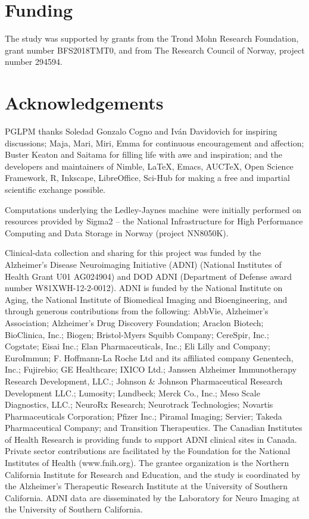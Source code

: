 \documentclass[utf8]{FrontiersinHarvard_mod} %
\renewcommand*{\|}[1][]{\nonscript\:#1\vert\nonscript\:\mathopen{}}
\newcommand*{\ljm}{Ledley-Jaynes machine}
\begin{document}
\section*{Funding}
The study was supported by grants from the Trond Mohn Research Foundation, grant number BFS2018TMT0, and from The Research Council of Norway, project number 294594.

\section*{Acknowledgements}
PGLPM thanks Soledad Gonzalo Cogno and Iv\'an Davidovich for inspiring discussions;
Maja, Mari, Miri, Emma for continuous encouragement and affection; Buster Keaton and Saitama for filling life with awe and inspiration; and the developers and maintainers of Nimble, \LaTeX, Emacs, AUC\TeX, Open Science Framework, R, Inkscape, LibreOffice, Sci-Hub for making a free and impartial scientific exchange possible.

Computations underlying the \ljm\ were initially performed on resources provided by Sigma2 -- the National Infrastructure for High Performance Computing and Data Storage in Norway (project NN8050K).


Clinical-data collection and sharing for this project was funded by the Alzheimer’s Disease Neuroimaging Initiative (ADNI) (National Institutes of Health Grant U01 AG024904) and DOD ADNI (Department of Defense award number W81XWH-12-2-0012). ADNI is funded by the National Institute on Aging, the National Institute of Biomedical Imaging and Bioengineering, and through generous contributions from the following: AbbVie, Alzheimer’s Association; Alzheimer’s Drug Discovery Foundation; Araclon Biotech; BioClinica, Inc.; Biogen; Bristol-Myers Squibb Company; CereSpir, Inc.; Cogstate; Eisai Inc.; Elan Pharmaceuticals, Inc.; Eli Lilly and Company; EuroImmun; F. Hoffmann-La Roche Ltd and its affiliated company Genentech, Inc.; Fujirebio; GE Healthcare; IXICO Ltd.; Janssen Alzheimer Immunotherapy Research Development, LLC.; Johnson \& Johnson Pharmaceutical Research Development LLC.; Lumosity; Lundbeck; Merck Co., Inc.; Meso Scale Diagnostics, LLC.; NeuroRx Research; Neurotrack Technologies; Novartis Pharmaceuticals Corporation; Pfizer Inc.; Piramal Imaging; Servier; Takeda Pharmaceutical Company; and Transition Therapeutics. The Canadian Institutes of Health Research is providing funds to support ADNI clinical sites in Canada. Private sector contributions are facilitated by the Foundation for the National Institutes of Health (www.fnih.org). The grantee organization is the Northern California Institute for Research and Education, and the study is coordinated by the Alzheimer’s Therapeutic Research Institute at the University of Southern California. ADNI data are disseminated by the Laboratory for Neuro Imaging at the University of Southern California. 
\end{document}
